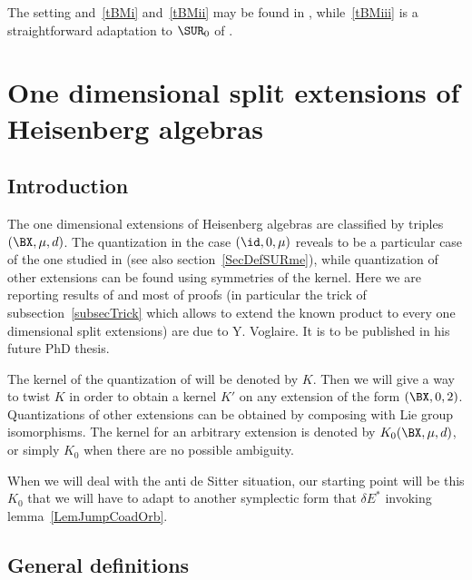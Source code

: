 The setting and~\ref{tBMi} and~\ref{tBMii} may be found in \cite{Biel-Massar}, while~\ref{tBMiii} is a straightforward adaptation  to $\SUR_0$ of \cite{lcBBM}.


%
\section{One dimensional split extensions of Heisenberg algebras} \label{SecExtHeiz}
%

\subsection{Introduction}

The one dimensional extensions of Heisenberg algebras are classified by triples $(\BX,\mu,d)$. The quantization in the case $(\id,0,\mu)$  reveals to be a particular case of the one studied in \cite{Biel-Massar} (see also section~\ref{SecDefSURme}),%
while quantization of other extensions can be found using symmetries of the kernel. Here we are reporting results of \cite{articleBVCS} and most of proofs (in particular the trick of subsection~\ref{subsecTrick} %
which allows to extend the known product to every one dimensional split extensions) are due to Y. Voglaire. It is to be published in his future PhD thesis.

The kernel of the quantization of \cite{Biel-Massar} will be denoted by $K$.  Then we will give a way to twist $K$ in order to obtain a kernel $K'$ on any extension of the form $(\BX,0,2)$. Quantizations of other extensions can be obtained by composing with Lie group isomorphisms. The kernel for an arbitrary extension is denoted by $K_{0}(\BX,\mu,d)$, or simply $K_{0}$ when there are no possible ambiguity.

When we will deal with the anti de Sitter situation, our starting point will be this $K_{0}$ that we will have to adapt to another symplectic form that $\delta E^*$ invoking lemma~\ref{LemJumpCoadOrb}.

\subsection{General definitions}

